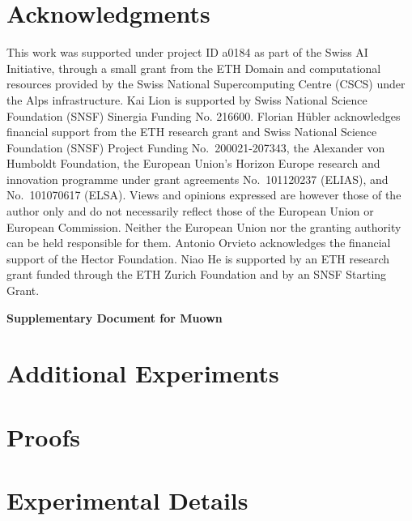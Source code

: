 \documentclass{article}
\newcommand{\algname}{Muown}
\begin{document}
\section*{Acknowledgments}
This work was supported under project ID a0184 as part of the Swiss AI Initiative, through a small grant from the ETH Domain and computational resources provided by the Swiss National Supercomputing Centre (CSCS) under the Alps infrastructure. Kai Lion is supported by Swiss National Science Foundation (SNSF) Sinergia Funding No. 216600. Florian Hübler acknowledges financial support from the ETH research grant and Swiss National Science Foundation (SNSF) Project Funding No.~200021-207343, the Alexander von Humboldt Foundation, the European Union’s Horizon Europe research and innovation programme under grant agreements No.~101120237 (ELIAS), and No.~101070617 (ELSA). Views and opinions expressed are however those of the author only and do not necessarily reflect those of the European Union or European Commission. Neither
the European Union nor the granting authority can be held responsible for them. Antonio Orvieto acknowledges the financial support of the Hector Foundation. Niao He is supported by an ETH research grant funded through the ETH Zurich Foundation and by an SNSF Starting Grant.




\newpage
\appendix

\begin{center}
{\Large  \bf Supplementary Document for \algname{}}
\end{center}
\tableofcontents
\newpage


\section{Additional Experiments}
\label{appdx:additional-experiments}


\section{Proofs}
\label{appdx:proofs}


\newpage
\section{Experimental Details}
\label{appdx:experimental-details}

\end{document}

